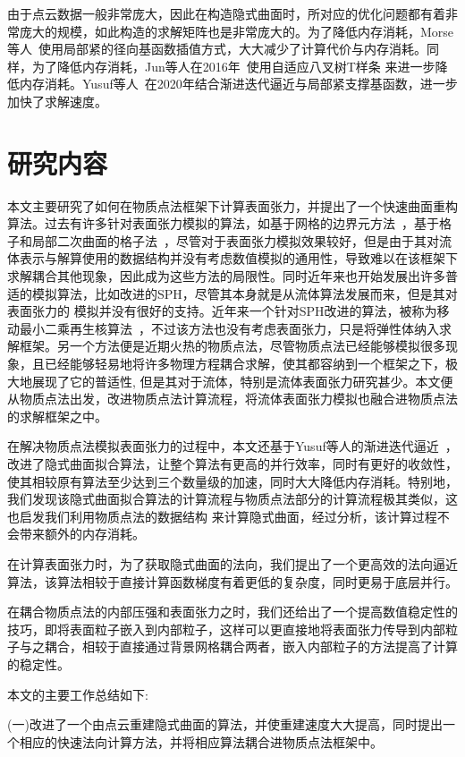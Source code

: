 由于点云数据一般非常庞大，因此在构造隐式曲面时，所对应的优化问题都有着非常庞大的规模，如此构造的求解矩阵也是非常庞大的。为了降低内存消耗，Morse等人~\cite{morse2005interpolating}使用局部紧的径向基函数插值方式，大大减少了计算代价与内存消耗。同样，为了降低内存消耗，Jun等人在2016年~\cite{wang2010adaptive}使用自适应八叉树T样条
来进一步降低内存消耗。Yusuf等人~\cite{hamza2020implicit}在2020年结合渐进迭代逼近与局部紧支撑基函数，进一步加快了求解速度。
\section{研究内容}
本文主要研究了如何在物质点法框架下计算表面张力，并提出了一个快速曲面重构算法。过去有许多针对表面张力模拟的算法，如基于网格的边界元方法~\cite{da2016surface}，基于格子和局部二次曲面的格子法~\cite{wang2020codimensional}，尽管对于表面张力模拟效果较好，但是由于其对流体表示与解算使用的数据结构并没有考虑数值模拟的通用性，导致难以在该框架下求解耦合其他现象，因此成为这些方法的局限性。同时近年来也开始发展出许多普适的模拟算法，比如改进的SPH，尽管其本身就是从流体算法发展而来，但是其对表面张力的
模拟并没有很好的支持。近年来一个针对SPH改进的算法，被称为移动最小二乘再生核算法~\cite{chen2020moving}，不过该方法也没有考虑表面张力，只是将弹性体纳入求解框架。另一个方法便是近期火热的物质点法，尽管物质点法已经能够模拟很多现象，且已经能够轻易地将许多物理方程耦合求解，使其都容纳到一个框架之下，极大地展现了它的普适性,
但是其对于流体，特别是流体表面张力研究甚少。本文便从物质点法出发，改进物质点法计算流程，将流体表面张力模拟也融合进物质点法的求解框架之中。

在解决物质点法模拟表面张力的过程中，本文还基于Yusuf等人的渐进迭代逼近~\cite{hamza2020implicit}，改进了隐式曲面拟合算法，让整个算法有更高的并行效率，同时有更好的收敛性，使其相较原有算法至少达到三个数量级的加速，同时大大降低内存消耗。特别地，我们发现该隐式曲面拟合算法的计算流程与物质点法部分的计算流程极其类似，这也启发我们利用物质点法的数据结构
来计算隐式曲面，经过分析，该计算过程不会带来额外的内存消耗。

在计算表面张力时，为了获取隐式曲面的法向，我们提出了一个更高效的法向逼近算法，该算法相较于直接计算函数梯度有着更低的复杂度，同时更易于底层并行。

在耦合物质点法的内部压强和表面张力之时，我们还给出了一个提高数值稳定性的技巧，即将表面粒子嵌入到内部粒子，这样可以更直接地将表面张力传导到内部粒子与之耦合，相较于直接通过背景网格耦合两者，嵌入内部粒子的方法提高了计算的稳定性。

本文的主要工作总结如下:

(一)改进了一个由点云重建隐式曲面的算法，并使重建速度大大提高，同时提出一个相应的快速法向计算方法，并将相应算法耦合进物质点法框架中。

